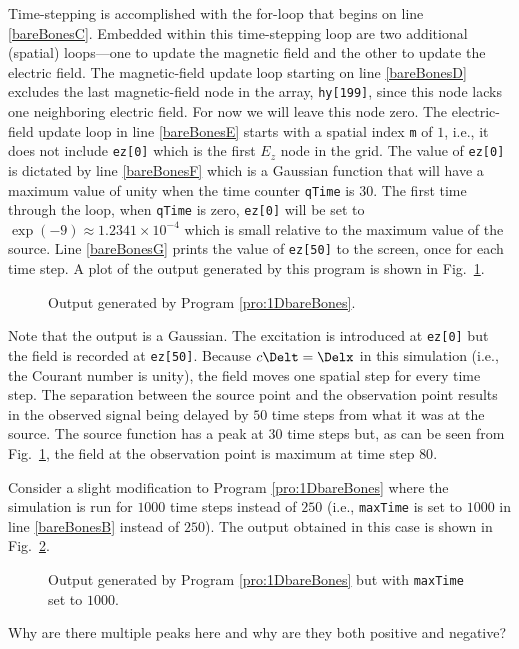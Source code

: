 Time-stepping is accomplished with the for-loop that begins on line
\ref{bareBonesC}.  Embedded within this time-stepping loop are two
additional (spatial) loops---one to update the magnetic field and the
other to update the electric field.  The magnetic-field update loop
starting on line \ref{bareBonesD} excludes the last magnetic-field
node in the array, {\tt hy[199]}, since this node lacks one
neighboring electric field.  For now we will leave this node zero.
The electric-field update loop in line \ref{bareBonesE} starts with a
spatial index {\tt m} of $1$, i.e., it does not include {\tt ez[0]}
which is the first $E_z$ node in the grid.  The value of {\tt ez[0]}
is dictated by line \ref{bareBonesF} which is a Gaussian function that
will have a maximum value of unity when the time counter {\tt qTime}
is $30$.  The first time through the loop, when {\tt qTime} is zero,
{\tt ez[0]} will be set to $\exp(-9)\approx 1.2341\times 10^{-4}$
which is small relative to the maximum value of the source.  Line
\ref{bareBonesG} prints the value of {\tt ez[50]} to the screen, once
for each time step.  A plot of the output generated by this program is
shown in Fig.\
\ref{fig:bareBones}.
\begin{figure}
  \begin{center}
  \end{center}
  \caption{Output generated by Program \ref{pro:1DbareBones}.}
  \label{fig:bareBones} 
\end{figure}

Note that the output is a Gaussian.  The excitation is introduced at
{\tt ez[0]} but the field is recorded at {\tt ez[50]}.  Because
$c\Delt=\Delx$ in this simulation (i.e., the Courant number is unity),
the field moves one spatial step for every time step.  The separation
between the source point and the observation point results in the
observed signal being delayed by $50$ time steps from what it was at
the source.  The source function has a peak at $30$ time steps but, as
can be seen from Fig.\ \ref{fig:bareBones}, the field at the
observation point is maximum at time step $80$.

Consider a slight modification to Program \ref{pro:1DbareBones} where
the simulation is run for $1000$ time steps instead of $250$ (i.e.,
{\tt maxTime} is set to $1000$ in line \ref{bareBonesB} instead of
$250$).  The output obtained in this case is shown in Fig.\
\ref{fig:bareBonesLong}.
\begin{figure}
  \begin{center}
  \end{center}
  \caption{Output generated by Program \ref{pro:1DbareBones} but with
  {\tt maxTime} set to $1000$.}
  \label{fig:bareBonesLong} 
\end{figure}
Why are there multiple peaks here and why are they both positive and
negative?

